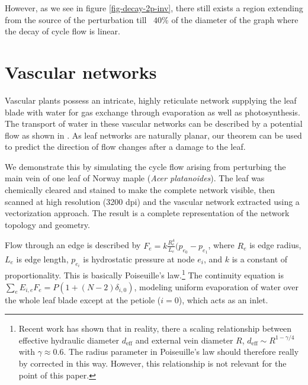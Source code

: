 \documentclass[10pt,aps,pra,twocolumn,superscriptaddress]{revtex4-1}
\begin{document}
However, as we see in figure \ref{fig-decay-2p-inv}, there still exists a 
region extending from the source of the perturbation till ~$40$\% of the 
diameter of the graph where the decay of cycle flow is linear.   





\section{Vascular networks}

Vascular plants possess an intricate, highly reticulate network 
supplying the leaf blade with water for gas exchange through
evaporation as well as photosynthesis.
The transport of water in these vascular networks can be described by a 
potential flow as shown in \cite{Kati10}.
As leaf networks are naturally planar, our theorem can be 
used to predict the direction of flow changes after a damage to the leaf.

We demonstrate this by simulating the cycle flow arising from perturbing
the main vein of one leaf of Norway maple (\emph{Acer platanoides}).
The leaf was chemically cleared and stained to make the complete network
visible, then scanned at high resolution (3200 dpi) and the vascular
network extracted using a vectorization approach. The result is a
complete representation of the network topology and geometry.

Flow through an edge is described by $F_e = k\frac{R_e^4}{L_e} (p_{e_0}
-p_{e_1}$, where $R_e$ is edge radius, $L_e$ is edge length, $p_{e_i}$
is hydrostatic pressure at node $e_i$, and $k$ is a constant of 
proportionality. This is basically Poiseuille's law.\footnote{Recent
work has shown that in reality, there a scaling relationship between
effective hydraulic diameter $d_\mathrm{eff}$ and external vein diameter
$R$, $d_\mathrm{eff} \sim R^{1-\gamma/4}$ with $\gamma \approx 0.6$.
The radius parameter in Poiseuille's law should therefore really by
corrected in this way. However, this relationship is not relevant for
the point of this paper.}
The continuity equation is $\sum_e E_{i,e} F_e = P(1 + (N-2)\delta_{i,0})$,
modeling uniform evaporation of water over the whole leaf blade 
except at the petiole ($i=0$), which acts as an inlet.
\end{document}
